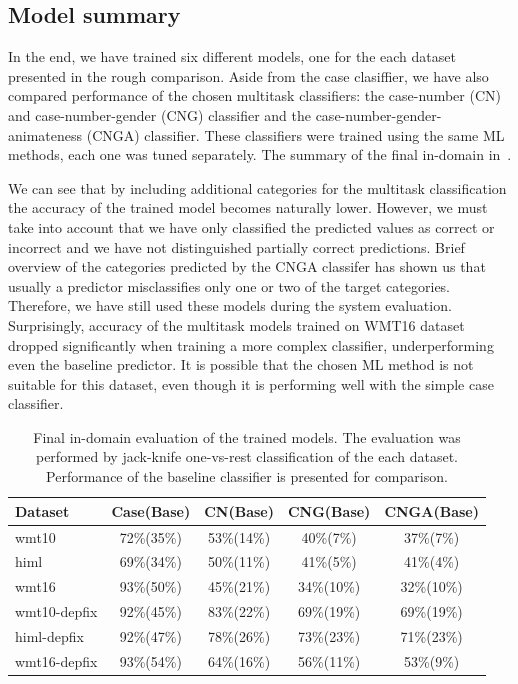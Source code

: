 
\subsection{Model summary}

In the end, we have trained six different models, one for the each dataset presented in the rough comparison.
Aside from the case clasiffier, we have also compared performance of the chosen multitask classifiers:
the case-number (CN) and case-number-gender (CNG) classifier and the case-number-gender-animateness (CNGA)
classifier. These classifiers were trained using the same ML methods, each one was tuned separately.
The summary of the final in-domain in~.

We can see that by including additional categories for the multitask classification the accuracy of the trained
model becomes naturally lower. However, we must take into account that we have only classified the predicted
values as correct or incorrect and we have not distinguished partially correct predictions. Brief overview
of the categories predicted by the CNGA classifer has shown us that usually a predictor misclassifies only
one or two of the target categories. Therefore, we have still used these models during the system evaluation.
Surprisingly, accuracy of the multitask models trained on WMT16 dataset dropped significantly when training a
more complex classifier, underperforming even the baseline predictor. It is possible that the chosen ML
method is not suitable for this dataset, even though it is performing well with the simple case classifier.

\begin{table}[t]
\centering
\small

\begin{tabular}{l|cccc}
Dataset  &  Case(Base)  &  CN(Base)  & CNG(Base)  &  CNGA(Base)  \\
\hline
wmt10  &  72\%(35\%)  &  53\%(14\%)  &  40\%(7\%)  &  37\%(7\%)  \\
himl  &  69\%(34\%)  &  50\%(11\%)  & 41\%(5\%)  &  41\%(4\%)  \\
wmt16  &  93\%(50\%)  &  45\%(21\%)  &  34\%(10\%)  &  32\%(10\%)  \\
wmt10-depfix  &  92\%(45\%)  &  83\%(22\%)  &  69\%(19\%)  &  69\%(19\%)  \\
himl-depfix  &  92\%(47\%)  &  78\%(26\%)  &  73\%(23\%)  &  71\%(23\%)  \\
wmt16-depfix  &  93\%(54\%)  &  64\%(16\%)  &  56\%(11\%)  &  53\%(9\%)  \\
\end{tabular}
\caption{
    Final in-domain evaluation of the trained models. The evaluation was performed
by jack-knife one-vs-rest classification of the each dataset. Performance of the baseline
classifier is presented for comparison.
}
\label{cats-summary}
\end{table}



